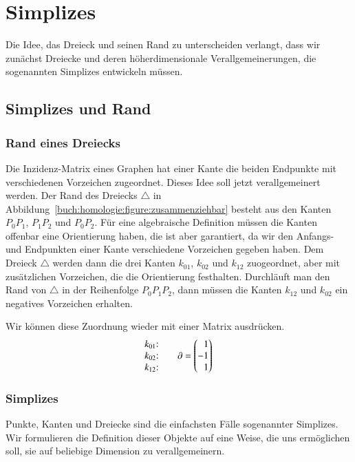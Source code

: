 %
%
%
\section{Simplizes
\label{buch:section:simplexe}}
Die Idee, das Dreieck und seinen Rand zu unterscheiden verlangt,
dass wir zunächst Dreiecke und deren höherdimensionale Verallgemeinerungen,
die sogenannten Simplizes entwickeln müssen.

\subsection{Simplizes und Rand
\label{buch:subsection:simplices}}

\subsubsection{Rand eines Dreiecks}
Die Inzidenz-Matrix eines Graphen hat einer Kante die beiden Endpunkte
mit verschiedenen Vorzeichen zugeordnet.
Dieses Idee soll jetzt verallgemeinert werden.
Der Rand des Dreiecks $\triangle$ in
Abbildung~\ref{buch:homologie:figure:zusammenziehbar}
besteht aus den Kanten $P_0P_1$, $P_1P_2$ und $P_0P_2$.
Für eine algebraische Definition müssen die Kanten offenbar eine
Orientierung haben, die ist aber garantiert, da wir den Anfangs-
und Endpunkten einer Kante verschiedene Vorzeichen gegeben haben.
Dem Dreieck $\triangle$ werden dann die drei Kanten $k_{01}$, $k_{02}$
und $k_{12}$ zuogeordnet, aber mit zusätzlichen Vorzeichen, die
die Orientierung festhalten.
Durchläuft man den Rand von $\triangle$ in der Reihenfolge $P_0P_1P_2$,
dann müssen die Kanten $k_{12}$ und $k_{02}$ ein negatives Vorzeichen
erhalten.

Wir können diese Zuordnung wieder mit einer Matrix ausdrücken.
\[
\begin{matrix}
\text{$k_{01}$:}\mathstrut\\
\text{$k_{02}$:}\mathstrut\\
\text{$k_{12}$:}\mathstrut
\end{matrix}
\qquad
\partial
=
\begin{pmatrix*}[r]
1\mathstrut\\
-1\mathstrut\\
1\mathstrut
\end{pmatrix*}
\]

\subsubsection{Simplizes}
Punkte, Kanten und Dreiecke sind die einfachsten Fälle sogenannter
Simplizes.
Wir formulieren die Definition dieser Objekte auf eine Weise,
die uns ermöglichen soll, sie auf beliebige Dimension zu verallgemeinern.

